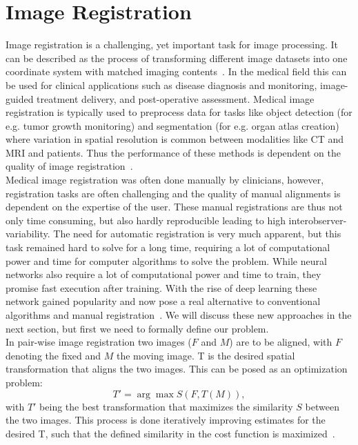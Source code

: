 \documentclass[english,version-2022-01]{uzl-thesis} %
\begin{document}
\section{Image Registration}
Image registration is a challenging, yet important task for image processing. It can be described as the process of transforming different
image datasets into one coordinate system with matched imaging contents~\cite{Haskins2020}. In the medical field this can be used for clinical applications such as disease diagnosis and monitoring, image-guided treatment delivery, and post-operative assessment. Medical image registration is typically used to preprocess data for tasks like object detection (for e.g. tumor growth monitoring) and segmentation (for e.g. organ atlas creation) where variation in spatial resolution is common between modalities like CT and MRI and patients. Thus the performance of these methods is dependent on the quality of image registration~\cite{Chen2020}. \\
Medical image registration was often done manually by clinicians, however, registration tasks are often challenging and the quality of manual alignments is dependent on the expertise of the user. These manual registrations are thus not only time consuming, but also hardly reproducible leading to high interobserver-variability. The need for automatic registration is very much apparent, but this task remained hard to solve for a long time, requiring a lot of computational power and time for computer algorithms to solve the problem. While neural networks also require a lot of computational power and time to train, they promise fast execution after training. With the rise of deep learning these network gained popularity and now pose a real alternative to conventional algorithms and manual registration~\cite{Haskins2020}. We will discuss these new approaches in the next section, but first we need to formally define our problem.\\
In pair-wise image registration two images ($F$ and $M$) are to be aligned, with $F$ denoting the fixed and $M$ the moving image. T is the desired spatial transformation that aligns the two images. This can be posed as an optimization problem:
\begin{equation}
	T' = \arg\max S(F, T(M)),
\end{equation}
with $T'$ being the best transformation that maximizes the similarity $S$ between the two images. This process is done iteratively improving estimates for the desired T, such that the defined similarity in the cost function is maximized~\cite{Chen2020}.\\
\end{document}
